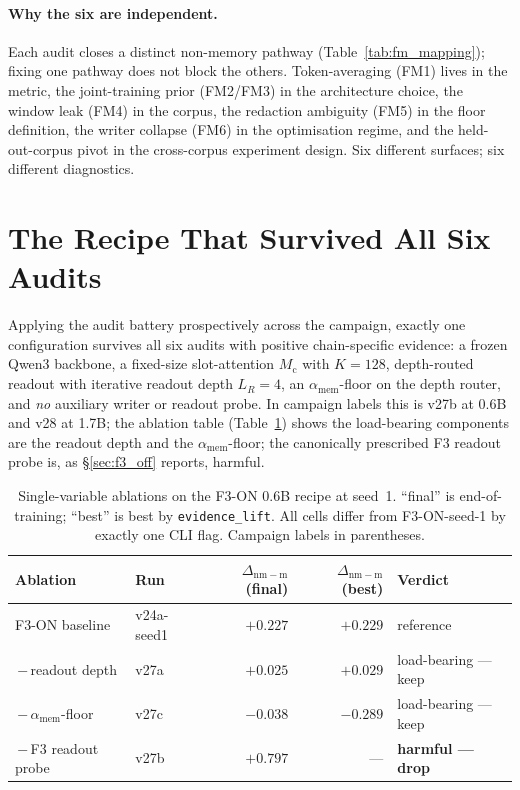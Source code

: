 \documentclass{article}
\newcommand{\Mc}{M_{\mathrm{c}}}
\newcommand{\dnm}{\Delta_{\mathrm{nm-m}}}
\newcommand{\amem}{\alpha_{\mathrm{mem}}}
\begin{document}
\paragraph{Why the six are independent.}  Each audit closes a
distinct non-memory pathway (Table~\ref{tab:fm_mapping}); fixing one
pathway does not block the others.  Token-averaging (FM1) lives in
the metric, the joint-training prior (FM2/FM3) in the architecture
choice, the window leak (FM4) in the corpus, the redaction
ambiguity (FM5) in the floor definition, the writer collapse (FM6)
in the optimisation regime, and the held-out-corpus pivot in the
cross-corpus experiment design.  Six different surfaces; six
different diagnostics.

\section{The Recipe That Survived All Six Audits}
\label{sec:recipe_survived}

Applying the audit battery prospectively across the campaign,
exactly one configuration survives all six audits with positive
chain-specific evidence: a frozen Qwen3 backbone, a fixed-size
slot-attention $\Mc$ with $K=128$, depth-routed readout with
iterative readout depth $L_R{=}4$, an $\amem$-floor on the depth
router, and \emph{no} auxiliary writer or readout probe.  In
campaign labels this is v27b at 0.6B and v28 at 1.7B; the ablation
table (Table~\ref{tab:ablations}) shows the load-bearing components
are the readout depth and the $\amem$-floor; the canonically
prescribed F3 readout probe is, as \S\ref{sec:f3_off} reports,
harmful.

\begin{table}[t]
\centering
\caption{Single-variable ablations on the F3-ON 0.6B recipe at
seed~1.  ``final'' is end-of-training; ``best'' is best by
\texttt{evidence\_lift}.  All cells differ from F3-ON-seed-1 by
exactly one CLI flag.  Campaign labels in parentheses.}
\label{tab:ablations}
\small
\begin{tabular}{llrrl}
\toprule
Ablation              & Run    & $\dnm$ (final) & $\dnm$ (best) & Verdict \\
\midrule
F3-ON baseline                & v24a-seed1 & $+0.227$ & $+0.229$ & reference \\
\,$-$\,readout depth           & v27a       & $+0.025$ & $+0.029$ & load-bearing --- keep \\
\,$-$\,$\amem$-floor           & v27c       & $-0.038$ & $-0.289$ & load-bearing --- keep \\
\,$-$\,F3 readout probe        & v27b       & $+0.797$ & ---      & \textbf{harmful --- drop} \\
\bottomrule
\end{tabular}
\end{table}
\end{document}
